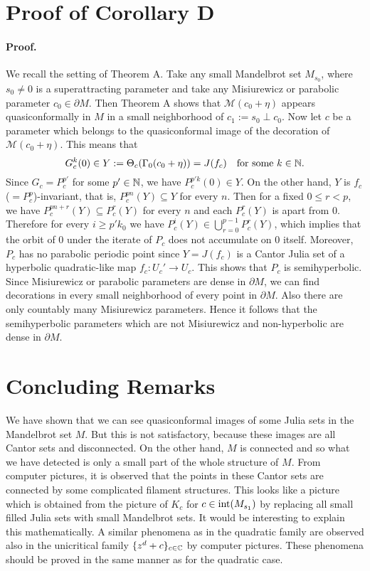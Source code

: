 \section{Proof of Corollary D}
\paragraph{\bf Proof.}
We recall the setting of Theorem A. Take any small Mandelbrot set
$M_{s_0}$, where $s_0 \ne 0$ is a superattracting parameter and
take any Misiurewicz or parabolic parameter $c_0 \in \partial M$.
Then Theorem A shows that ${\mathcal M}(c_0+\eta)$ appears quasiconformally
in $M$ in a small neighborhood of $c_1 := s_0 \perp c_0$. Now let
$c$ be a parameter which belongs to the quasiconformal image of the 
decoration of ${\mathcal M}(c_0+\eta)$. This means that
$$
  G_c^k(0) \in Y:=\Theta_c(\Gamma_0(c_0+\eta)) = J(f_c) \quad 
  \text{for some} \ k \in \mathbb N.
$$
Since $G_c = P_c^{p'}$ for some $p' \in \mathbb N$, we have
$P_c^{p'k}(0) \in Y$. On the other hand, 
$Y$ is $f_c$ ($=P_c^p$)-invariant, that is, 
$P_c^{pn}(Y) \subseteq Y$ for every $n$. Then
for a fixed $0 \leq  r < p$, we have
$P_c^{pn+r}(Y) \subseteq P_c^r(Y)$ for every $n$ and each $P_c^r(Y)$ is 
apart from $0$. Therefore for every $i \geq p'k_0$ we have
$P_c^i(Y) \in \bigcup_{r=0}^{p-1} P_c^r(Y)$, which implies that
the orbit of $0$ under the iterate of $P_c$ does not accumulate 
on $0$ itself. Moreover, $P_c$ has no parabolic periodic point
since $Y = J(f_c)$ is a Cantor Julia set of a hyperbolic quadratic-like
map $f_c : U_c' \to U_c$. 
This shows that $P_c$ is semihyperbolic. 
Since Misiurewicz or parabolic parameters are dense in $\partial M$, we can
find decorations in every small neighborhood of every point in $\partial M$. 
Also there are only countably many Misiurewicz parameters. Hence it follows 
that the semihyperbolic parameters which are not Misiurewicz and 
non-hyperbolic are dense in $\partial M$.
\QED











\section{Concluding Remarks}
We have shown that we can see quasiconformal images of some Julia sets
in the Mandelbrot set $M$. But this is not satisfactory, because these 
images are all Cantor sets and disconnected. On the other hand, $M$ is 
connected and so what we have detected is only a small part of the whole
structure of $M$. From computer pictures, it is observed that the points
in these Cantor sets are connected by some complicated filament structures.
This looks like a picture which is obtained from the picture of $K_c$ 
for $c \in {\rm int} (M_{s_1})$ by replacing all small filled Julia sets
with small Mandelbrot sets.
It would be interesting to explain this mathematically.
A similar phenomena as in the quadratic family are observed also in the 
unicritical family $\{ z^d+c \}_{c \in \mathbb C}$ by computer pictures. 
These phenomena should
be proved in the same manner as for the quadratic case.

